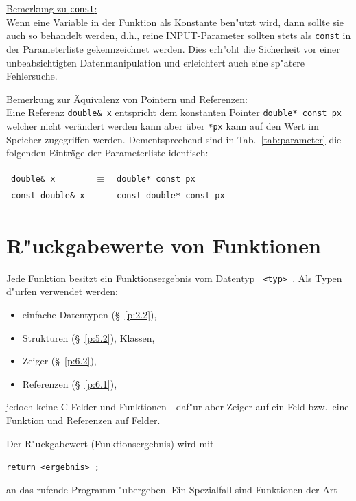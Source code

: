 \begin{samepage}
\underline{Bemerkung zu \texttt{const}:}
\\[0.5ex]
 Wenn eine Variable in der Funktion als Konstante ben"utzt wird,
 	dann sollte  sie  auch so behandelt werden, d.h.,
	reine INPUT-Parameter sollten stets als \verb|const|
	in der Parameterliste gekennzeichnet werden.
	Dies erh"oht die Sicherheit vor einer unbeabsichtigten
	Datenmanipulation und erleichtert auch eine sp"atere Fehlersuche.
\end{samepage}
%
%

\noindent
\underline{Bemerkung zur Äquivalenz von Pointern und Referenzen:}\\[0.5ex]
Eine Referenz \verb|double& x| entspricht dem konstanten Pointer \verb|double* const px| welcher 
nicht verändert werden kann aber über \verb|*px| kann auf den Wert im Speicher zugegriffen werden.
Dementsprechend sind in Tab.~\ref{tab:parameter} die folgenden Einträge der Parameterliste identisch:
\\[1ex]
\begin{tabular}{lcl}
  \verb|double& x|   & $\equiv$ &  \verb|double* const px| \\
  \verb|const double& x|   & $\equiv$ &  \verb|const double* const px|
\end{tabular}

%
%
\section{R"uckgabewerte von Funktionen}
\label{p:7.3}
%
Jede Funktion besitzt ein Funktionsergebnis vom Datentyp \verb| <typ> |.
Als Typen  d"urfen verwendet werden:
\begin{itemize}
 \item einfache Datentypen (\S~\ref{p:2.2}),
 \item Strukturen (\S~\ref{p:5.2}), Klassen,
 \item Zeiger (\S~\ref{p:6.2}),
 \item Referenzen (\S~\ref{p:6.1}),
\end{itemize}
jedoch keine C-Felder und Funktionen - daf"ur aber Zeiger auf ein Feld bzw.\
eine Funktion und Referenzen auf Felder.

Der R"uckgabewert  (Funktionsergebnis) wird mit

\verb|return <ergebnis> ;|

an das rufende Programm "ubergeben.
Ein Spezialfall sind Funktionen der  Art

